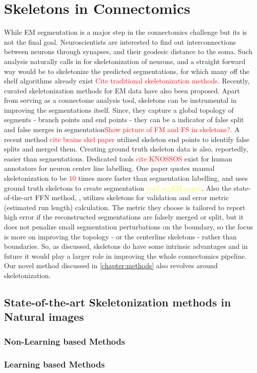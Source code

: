 \section{Skeletons in Connectomics}
While EM segmentation is a major step in the connectomics challenge but its is not the final goal. Neuroscientists are interested to find out interconnections between neurons through synapses, and their geodesic distance to the soma. Such analysis naturally calls in for skeletonization of neurons, and a straight forward way would be to skeletonize the predicted segmentations, for which many off the shelf algorithms already exist \textcolor{red}{Cite traditional skeletonization methods}. Recently, curated skeletonization methods for EM data have also been proposed. 
Apart from serving as a connectome analysis tool, skeletons can be instrumental in improving the segmentations itself. Since, they capture a global topology of segments - branch points and end points - they can be a indicator of false split and false merges in segmentation\textcolor{red}{Show picture of FM and FS in skeletons?}. A recent method \textcolor{red}{cite brains skel paper} utilized skeleton end points to identify false splits and merged them.
Creating ground truth skeleton data is also, reportedly, easier than segmentations. Dedicated tools \textcolor{red}{cite KNOSSOS} exist for human annotators for neuron center line labelling. One paper quotes manual skeletonization to be \textcolor{red}{$10$} times more faster than segmentation labelling, and uses ground truth skeletons to create segmentation \textcolor{yellow}{read segEM paper}. Also the state-of-the-art FFN method, \cite{Januszewski2017FFN}, \cite{Januszewski2018FFN} utilizes skeletons for validation and error metric (estimated run length) calculation. The metric they choose is tailored to report high error if the reconstructed segmentations are falsely merged or split, but it does not penalize small segmentation perturbations on the boundary, so the focus is more on improving the topology - or the centerline skeletons - rather than boundaries. 
So, as discussed, skeletons do have some intrinsic advantages and in future it would play a larger role in improving the whole connectomics pipeline. Our novel method discussed in \autoref{chapter:methods} also revolves around skeletonization.

\subsection{State-of-the-art Skeletonization methods in Natural images}
\subsubsection{Non-Learning based Methods}
\subsubsection{Learning based Methods}